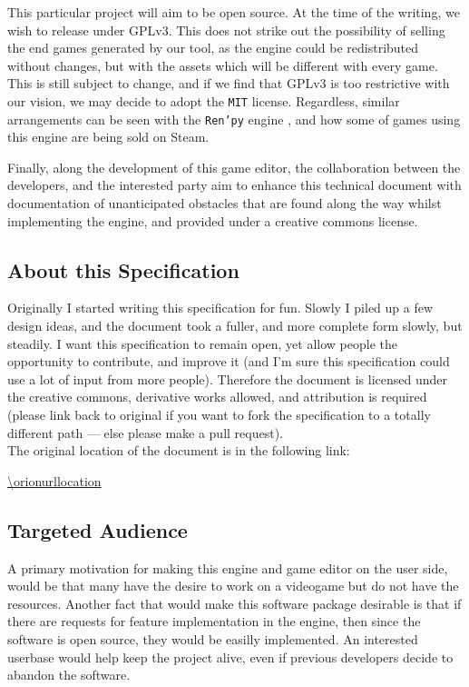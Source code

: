 This particular project will aim to be open source. At the time of the writing,
we wish to release under GPLv3. This does not strike out the possibility of
selling the end games generated by our tool, as the engine could be
redistributed without changes, but with the assets which will be different with
every game. This is still subject to change, and if we find that GPLv3 is too
restrictive with our vision, we may decide to adopt the \texttt{MIT} license.
Regardless, similar arrangements can be seen with the \texttt{Ren'py} engine
\cite{renpy}, and how some of games using this engine are being sold on Steam.

Finally, along the development of this game editor, the collaboration between
the developers, and the interested party aim to enhance this technical document
with documentation of unanticipated obstacles that are found along the way
whilst implementing the engine, and provided under a creative commons license.

\subsection{About this Specification}

Originally I started writing this specification for fun. Slowly I piled up a few
design ideas, and the document took a fuller, and more complete form slowly, but
steadily. I want this specification to remain open, yet allow people the
opportunity to contribute, and improve it (and I'm sure this specification could
use a lot of input from more people). Therefore the document is licensed under
the creative commons, derivative works allowed, and attribution is required
(please link back to original if you want to fork the specification to a totally
different path --- else please make a pull request).
\\[0.2in]
\noindent The original location of the document is in the following link:

\url{\orionurllocation}

\subsection{Targeted Audience}

A primary motivation for making this engine and game editor on the user side,
would be that many have the desire to work on a videogame but do not have the
resources. Another fact that would make this software package desirable is that
if there are requests for feature implementation in the engine, then since the
software is open source, they would be easilly implemented. An interested
userbase would help keep the project alive, even if previous developers decide
to abandon the software.

